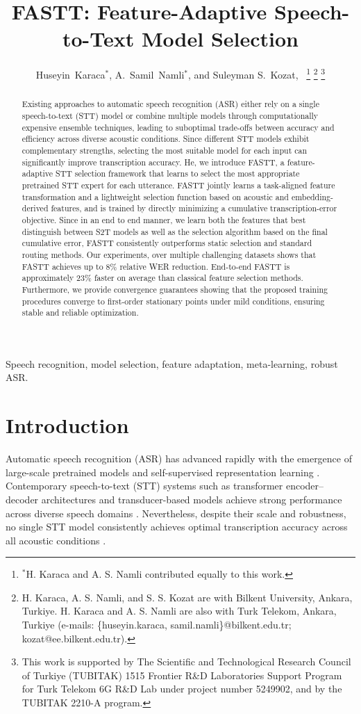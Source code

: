 \documentclass[journal]{IEEEtran}
\title{FASTT: Feature-Adaptive Speech-to-Text Model Selection}
\author{Huseyin~Karaca$^{*}$,
        A.~Samil~Namli$^{*}$, 
        and Suleyman S.~Kozat,~\IEEEmembership{Senior~Member,~IEEE}
\thanks{$^{*}$H. Karaca and A. S. Namli contributed equally to this work.}
\thanks{H. Karaca, A. S. Namli, and S. S. Kozat are with Bilkent University, Ankara, Turkiye. H. Karaca and A. S. Namli are also with Turk Telekom, Ankara, Turkiye (e-mails: \{huseyin.karaca, samil.namli\}@bilkent.edu.tr; kozat@ee.bilkent.edu.tr).}%
\thanks{This work is supported by The Scientific and Technological Research Council of Turkiye (TUBITAK) 1515 Frontier R\&D Laboratories Support Program for Turk Telekom 6G R\&D Lab under project number 5249902, and by the TUBITAK 2210-A program.}%
}
\date{}
\begin{document}
    \maketitle

    \begin{abstract}
    Existing approaches to automatic speech recognition (ASR) either rely on a single speech-to-text (STT) model or combine multiple models through computationally expensive ensemble techniques, leading to suboptimal trade-offs between accuracy and efficiency across diverse acoustic conditions. Since different STT models exhibit complementary strengths, selecting the most suitable model for each input can significantly improve transcription accuracy. He, we introduce FASTT, a feature-adaptive STT selection framework that learns to select the most appropriate pretrained STT expert for each utterance. FASTT jointly learns a task-aligned feature transformation and a lightweight selection function based on acoustic and embedding-derived features, and is trained by directly minimizing a cumulative transcription-error objective. Since in an end to end manner, we learn both the features that best distinguish between S2T models as well as the selection algorithm based on the final cumulative error, FASTT consistently outperforms static selection and standard routing methods. Our experiments, over multiple challenging datasets shows that FASTT achieves up to 8\% relative WER reduction. End-to-end FASTT is approximately 23\% faster on average than classical feature selection methods. Furthermore, we provide convergence guarantees showing that the proposed training procedures converge to first-order stationary points under mild conditions, ensuring stable and reliable optimization.
    \end{abstract}

    \begin{IEEEkeywords}
        Speech recognition, model selection, feature adaptation, meta-learning, robust ASR.
    \end{IEEEkeywords}

    \section{Introduction}

    Automatic speech recognition (ASR) has advanced rapidly with the emergence of
    large-scale pretrained models and self-supervised representation learning \cite{baevski2020wav2vec,hsu2021hubert,radford2022whisper,Mohamed_2022}.
    Contemporary speech-to-text (STT) systems such as transformer encoder--decoder
    architectures and transducer-based models achieve strong performance across diverse
    speech domains \cite{prabhavalkar,dong2018speechtransformer,gulati2020conformer}.
    Nevertheless, despite their scale and robustness, no single STT model
    consistently achieves optimal transcription accuracy across all acoustic
    conditions \cite{hanzhuboosting,zhu_joint,cornell_chi}.
\end{document}
